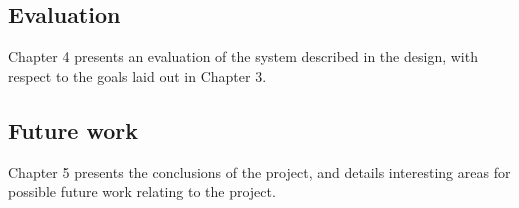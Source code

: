 \subsection{Evaluation}
Chapter 4 presents an evaluation of the system described in the design, with respect to the goals laid out in Chapter 3.

\subsection{Future work}
Chapter 5 presents the conclusions of the project, and details interesting areas for possible future work relating to the project.
